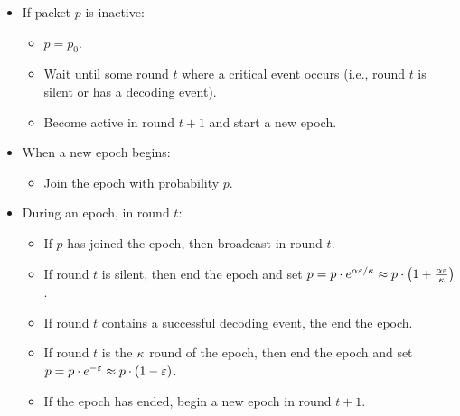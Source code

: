 \begin{itemize}
    \item If packet $p$ is inactive:
    \begin{itemize}
        \item $p = p_0$.
        \item Wait until some round $t$ where a critical event occurs (i.e., round $t$ is silent or has a decoding event).
        \item Become active in round $t+1$ and start a new epoch.
    \end{itemize}
    \item When a new epoch begins:
    \begin{itemize}
        \item Join the epoch with probability $p$.
    \end{itemize}
    \item During an epoch, in round $t$:
    \begin{itemize}
        \item If $p$ has joined the epoch, then broadcast in round $t$.
        \item If round $t$ is silent, then end the epoch and set 
            $p = p\cdot e^{\alpha\varepsilon/\kappa}\approx p\cdot\big(1+\frac{\alpha\varepsilon}{\kappa}\big)$.
        \item If round $t$ contains a successful decoding event, the end the epoch.
        \item If round $t$ is the $\kappa$ round of the epoch, then end the epoch and set 
        $p = p\cdot e^{-\varepsilon}\approx p\cdot (1-\varepsilon)$.
        \item If the epoch has ended, begin a new epoch in round $t+1$.
    \end{itemize}
\end{itemize}

